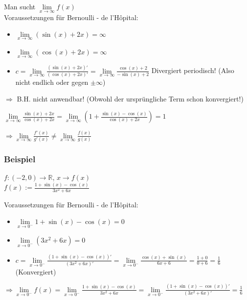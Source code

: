 \documentclass[11pt]{article} %
\begin{document}
Man sucht $\lim\limits_{x\rightarrow \infty}f(x)$\\


Voraussetzungen für Bernoulli - de l'Hôpital:
\begin{itemize}
\item $\lim\limits_{x\rightarrow \infty}(\sin(x) + 2x)= \infty$ 
\item $\lim\limits_{x\rightarrow \infty} (\cos(x) + 2x) = \infty $
\item $c= \lim\limits_{x\rightarrow \infty}\frac{(\sin(x)+ 2x )'}{(\cos(x) + 2x)'} = \lim\limits_{x\rightarrow \infty}\frac{\cos(x) + 2}{-\sin(x)+2} $ Divergiert periodisch! (Also nicht endlich oder gegen $\pm \infty$)
\end{itemize}

$\Rightarrow$ B.H. nicht anwendbar! (Obwohl der ursprüngliche Term schon konvergiert!)


$ \lim \limits_{x \rightarrow \infty} \frac{\sin(x) + 2x}{\cos(x) + 2x} = \lim \limits_{x \rightarrow \infty}( 1 + \frac{\sin(x) - \cos(x) }{\cos(x) + 2x}) = 1 $ 

$\Rightarrow \lim\limits_{x \rightarrow \infty} \frac{f'(x)}{g'(x)} \neq \lim \limits_{x \rightarrow \infty} \frac{f(x)}{g(x)}$

\subsubsection{Beispiel}
$f:  (-2,0) \rightarrow \mathbb{R}$, $x\rightarrow f(x) $\\
$f(x):= \frac{1+\sin(x)-\cos(x)}{3x^2 + 6x}$

Voraussetzungen für Bernoulli - de l'Hôpital:
\begin{itemize}
\item $\lim\limits_{x\rightarrow 0^-} 1 + \sin(x) - \cos(x) = 0$ 
\item $\lim\limits_{x\rightarrow 0^-} (3x^2+6x) = 0 $
\item $c= \lim\limits_{x\rightarrow 0^-}\frac{(1+\sin(x)-\cos(x))'}{(3x^2 + 6x)'} = \lim\limits_{x\rightarrow 0^-}\frac{\cos(x)+\sin(x)}{6x + 6} =\frac{1+0}{0 + 6}=\frac{1}{6}$ (Konvergiert)\\
\end{itemize}

 $\Rightarrow \lim\limits_{x\rightarrow 0^-}f(x)= \lim\limits_{x\rightarrow 0^-}\frac{1+\sin(x)-\cos(x)}{3x^2 + 6x} = \lim\limits_{x\rightarrow 0^-}\frac{(1+\sin(x)-\cos(x))'}{(3x^2 + 6x)'} =\frac{1}{6}$ 
\end{document}
